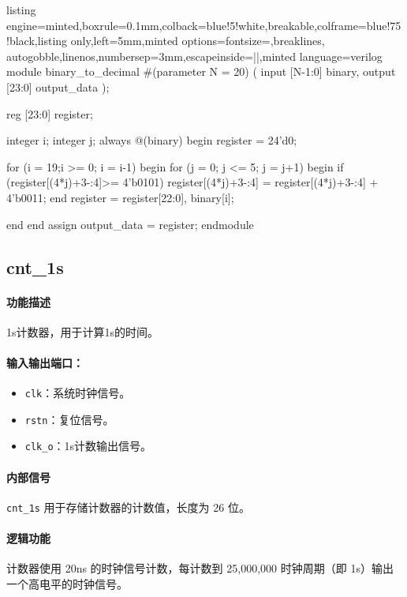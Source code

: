 \documentclass[a4paper]{article}
\begin{document}
\begin{tcblisting}{listing engine=minted,boxrule=0.1mm,colback=blue!5!white,breakable,colframe=blue!75!black,listing only,left=5mm,minted options={fontsize=\small,breaklines, autogobble,linenos,numbersep=3mm,escapeinside=||},minted language=verilog}
module binary_to_decimal #(parameter N = 20)
(
    input [N-1:0] binary,
    output [23:0] output_data
    );

    reg [23:0] register;

integer i;
integer j;
    always @(binary) begin
        register = 24'd0;

        for (i = 19;i >= 0; i = i-1) begin
            for (j = 0; j <= 5; j = j+1) begin
                if (register[(4*j)+3-:4]>= 4'b0101) register[(4*j)+3-:4] = register[(4*j)+3-:4] + 4'b0011;
            end
            register = {register[22:0], binary[i]};

        end
    end
    assign output_data = register;
endmodule
\end{tcblisting}

\subsection{cnt\_1s}

\paragraph{功能描述} 1s计数器，用于计算1s的时间。

\paragraph{输入输出端口：}
\begin{itemize}
    \item \texttt{clk}：系统时钟信号。
    \item \texttt{rstn}：复位信号。
    \item \texttt{clk\_o}：1s计数输出信号。
\end{itemize}

\paragraph{内部信号} \texttt{cnt\_1s} 用于存储计数器的计数值，长度为 26 位。

\paragraph{逻辑功能}
计数器使用 20ns 的时钟信号计数，每计数到 25,000,000 时钟周期（即 1s）输出一个高电平的时钟信号。
\end{document}
